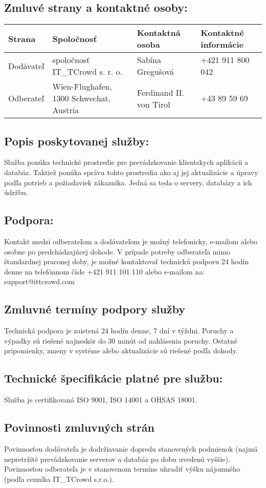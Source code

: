 \documentclass[a4paper, 11pt]{article}
\begin{document}
\begin{center}
\subsection*{Zmluvé strany a kontaktné osoby:}
\begin{tabular}{| l | l | l | l |}
\hline
\textbf{Strana} & \textbf{Spoločnosť} & \textbf{Kontaktná osoba} & \textbf{Kontaktné informácie} \\
\hline
Dodávateľ & spoločnosť IT\_TCrowd s. r. o. & Sabína Gregušová & +421 911 800 042\\
\hline
Odberateľ & Wien-Flughafen, 1300 Schwechat, Austria & Ferdinand II. von Tirol & +43 89 59 69\\
\hline
\end{tabular}

\subsection*{Popis poskytovanej služby:}
Služba ponúka technické prostredie pre prevádzkovanie klientskych aplikácii a databáz. Taktiež ponúka správu tohto prostredia ako aj jej aktualizácie a úpravy podľa potrieb a požiadaviek zákazníka. Jedná sa teda o servery, databázy a ich údržbu.

\subsection*{Podpora:}
Kontakt medzi odberateľom a dodávateľom je možný telefonicky, e-mailom alebo osobne po predchádzajúcej dohode. V prípade potreby odberateľa mimo štandardnej praconej doby, je možné kontaktovať technickú podporu 24 hodín denne na telefónnom čísle +421 911 101 110 alebo e-mailom na: support@ittcrowd.com 

\subsection*{Zmluvné termíny podpory služby}
Technická podpora je zaistená 24 hodín denne, 7 dní v týždni. Poruchy a výpadky sú riešené najneskôr do 30 minút od nahlásenia poruchy. Ostatné pripomienky, zmeny v systéme alebo aktualizácie sú riešené podľa dohody.

\subsection*{Technické špecifikácie platné pre službu:}
Služba je certifikovaná ISO 9001, ISO 14001 a OHSAS 18001.

\subsection*{Povinnosti zmluvných strán}
Povinnosťou dodávateľa je dodržiavanie dopredu stanovených podmienok (najmä nepretržité prevádzkovanie serverov a databáz po dobu uvedenú vyššie). Povinnosťou odberateľa je v stanovenom termíne uhradiť výšku nájomného (podľa cenníka IT\_TCrowd s.r.o.).


\end{center}
\end{document}
